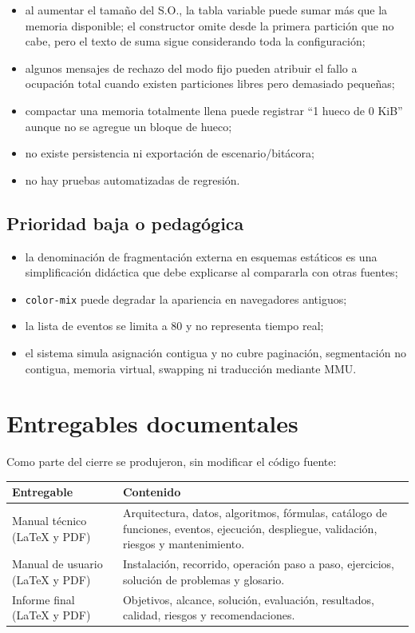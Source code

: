 \documentclass[11pt,a4paper]{article}
\begin{document}
\begin{itemize}
  \item al aumentar el tamaño del S.O., la tabla variable puede sumar más que la
  memoria disponible; el constructor omite desde la primera partición que no cabe,
  pero el texto de suma sigue considerando toda la configuración;
  \item algunos mensajes de rechazo del modo fijo pueden atribuir el fallo a
  ocupación total cuando existen particiones libres pero demasiado pequeñas;
  \item compactar una memoria totalmente llena puede registrar ``1 hueco de 0 KiB''
  aunque no se agregue un bloque de hueco;
  \item no existe persistencia ni exportación de escenario/bitácora;
  \item no hay pruebas automatizadas de regresión.
\end{itemize}

\subsection{Prioridad baja o pedagógica}

\begin{itemize}
  \item la denominación de fragmentación externa en esquemas estáticos es una
  simplificación didáctica que debe explicarse al compararla con otras fuentes;
  \item \texttt{color-mix} puede degradar la apariencia en navegadores antiguos;
  \item la lista de eventos se limita a 80 y no representa tiempo real;
  \item el sistema simula asignación contigua y no cubre paginación, segmentación
  no contigua, memoria virtual, swapping ni traducción mediante MMU.
\end{itemize}

\section{Entregables documentales}

Como parte del cierre se produjeron, sin modificar el código fuente:

\begin{longtable}{p{}p{}}
\toprule
\textbf{Entregable} & \textbf{Contenido}\\
\midrule
\endhead
Manual técnico (LaTeX y PDF) & Arquitectura, datos, algoritmos, fórmulas, catálogo de funciones, eventos, ejecución, despliegue, validación, riesgos y mantenimiento.\\
Manual de usuario (LaTeX y PDF) & Instalación, recorrido, operación paso a paso, ejercicios, solución de problemas y glosario.\\
Informe final (LaTeX y PDF) & Objetivos, alcance, solución, evaluación, resultados, calidad, riesgos y recomendaciones.\\
\bottomrule
\end{longtable}
\end{document}
